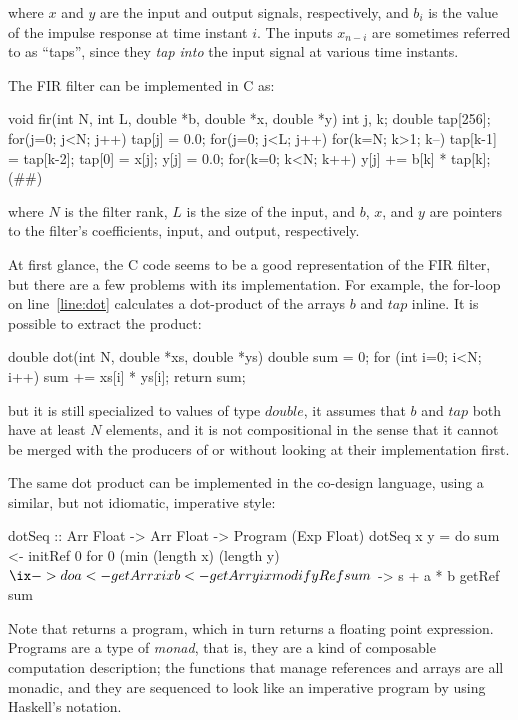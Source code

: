 \documentclass[../paper.tex]{subfiles}
\begin{document}
\noindent where $x$ and $y$ are the input and output signals, respectively, and $b_i$ is the value of the impulse response at time instant $i$. The inputs $x_{n-i}$ are sometimes referred to as ``taps'', since they \textit{tap into} the input signal at various time instants. 

The FIR filter can be implemented in C as:

\begin{code}
void fir(int N, int L, double *b, double *x, double *y) {
 int j, k;
 double tap[256];
 for(j=0; j<N; j++) tap[j] = 0.0;
 for(j=0; j<L; j++) {
  for(k=N; k>1; k--) tap[k-1] = tap[k-2];
  tap[0] = x[j];
  y[j] = 0.0;
  for(k=0; k<N; k++) y[j] += b[k] * tap[k]; (#\label{line:dot}#)
 }
}
\end{code}

\noindent where $N$ is the filter rank, $L$ is the size of the input, and $b$, $x$, and $y$ are pointers to the filter's coefficients, input, and output, respectively.

At first glance, the C code seems to be a good representation of the FIR filter, but there are a few problems with its implementation. For example, the for-loop on line~\ref{line:dot} calculates a dot-product of the arrays $b$ and $tap$ inline. It is possible to extract the product:

\begin{code}
double dot(int N, double *xs, double *ys) {
  double sum = 0;
  for (int i=0; i<N; i++) sum += xs[i] * ys[i];
  return sum;
}
\end{code}

\noindent but it is still specialized to values of type $double$, it assumes that $b$ and $tap$ both have at least $N$ elements, and it is not compositional in the sense that it cannot be merged with the producers of  or  without looking at their implementation first.

The same dot product can be implemented in the co-design language, using a similar, but not idiomatic, imperative style:

\begin{code}
dotSeq :: Arr Float -> Arr Float -> Program (Exp Float)
dotSeq x y = do
  sum <- initRef 0
  for 0 (min (length x) (length y) $ \ix -> do
    a <- getArr x ix
    b <- getArr y ix
    modifyRef sum $ \s -> s + a * b
  getRef sum
\end{code}

\noindent Note that  returns a program, which in turn returns a floating point expression. Programs are a type of \textit{monad}, that is, they are a kind of composable computation description; the functions that manage references and arrays are all monadic, and they are sequenced to look like an imperative program by using Haskell's  notation.
\end{document}
